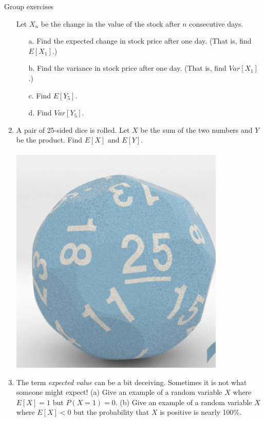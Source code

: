 \documentclass[10pt]{beamer}
\begin{document}
\begin{frame}{Group exercises}
\begin{enumerate}
	Let $X_n$ be the change in the value of the stock after $n$ consecutive days.
	 \begin{itemize} \footnotesize 
	\item[a.] Find the expected change in stock price after one day. (That is, find $E[X_1]$.)
	\item[b.] Find the variance in stock price after one day.  (That is, find $Var[X_1]$.)
	\item[c.] Find $E[Y_5]$.
	\item[d.] Find $Var[Y_5]$.
	\end{itemize}
	\vspace{-.2cm}
	\item  \leavevmode
	\begin{minipage}{.70\textwidth}
	\footnotesize  A pair of 25-sided dice is rolled. Let $X$ be the sum of the two numbers and $Y$ be the product. Find $E[X]$ and $E[Y]$.
	\end{minipage} %
	\hfill 
	\begin{minipage}{.15\textwidth}
	\includegraphics[width=.7\linewidth]{images/25_sided_die}
	\end{minipage}
	\vspace{-.1cm}
	\item  The term \textit{expected value} can be a bit deceiving. Sometimes it is not what someone might expect! (a) Give an example of a random variable $X$ where $E[X]=1$ but $P(X=1)=0$.  (b) Give an example of a random variable $X$ where $E[X]<0$ but the probability that $X$ is positive is nearly 100\%.
\end{enumerate}

\end{frame}
\end{document}
